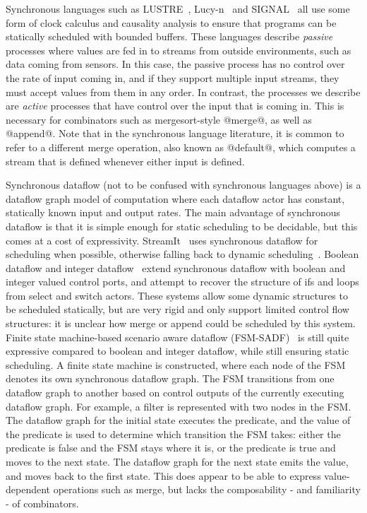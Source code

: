 Synchronous languages such as LUSTRE~\cite{halbwachs1991synchronous}, Lucy-n~\cite{mandel2010lucy} and SIGNAL~\cite{le2003polychrony} all use some form of clock calculus and causality analysis to ensure that programs can be statically scheduled with bounded buffers.
These languages describe \emph{passive} processes where values are fed in to streams from outside environments, such as data coming from sensors.
In this case, the passive process has no control over the rate of input coming in, and if they support multiple input streams, they must accept values from them in any order.
In contrast, the processes we describe are \emph{active} processes that have control over the input that is coming in.
This is necessary for combinators such as mergesort-style @merge@, as well as @append@.
Note that in the synchronous language literature, it is common to refer to a different merge operation, also known as @default@, which computes a stream that is defined whenever either input is defined.

Synchronous dataflow (not to be confused with synchronous languages above) is a dataflow graph model of computation where each dataflow actor has constant, statically known input and output rates.
The main advantage of synchronous dataflow is that it is simple enough for static scheduling to be decidable, but this comes at a cost of expressivity.
StreamIt~\cite{thies2002streamit} uses synchronous dataflow for scheduling when possible, otherwise falling back to dynamic scheduling~\cite{soule2013dynamic}.
Boolean dataflow and integer dataflow~\cite{buck1993scheduling,buck1994static} extend synchronous dataflow with boolean and integer valued control ports, and attempt to recover the structure of ifs and loops from select and switch actors.
These systems allow some dynamic structures to be scheduled statically, but are very rigid and only support limited control flow structures: it is unclear how merge or append could be scheduled by this system.
Finite state machine-based scenario aware dataflow (FSM-SADF)~\cite{stuijk2011scenario,van2015scenario} is still quite expressive compared to boolean and integer dataflow, while still ensuring static scheduling.
A finite state machine is constructed, where each node of the FSM denotes its own synchronous dataflow graph.
The FSM transitions from one dataflow graph to another based on control outputs of the currently executing dataflow graph.
For example, a filter is represented with two nodes in the FSM.
The dataflow graph for the initial state executes the predicate, and the value of the predicate is used to determine which transition the FSM takes: either the predicate is false and the FSM stays where it is, or the predicate is true and moves to the next state.
The dataflow graph for the next state emits the value, and moves back to the first state.
This does appear to be able to express value-dependent operations such as merge, but lacks the composability - and familiarity - of combinators.

